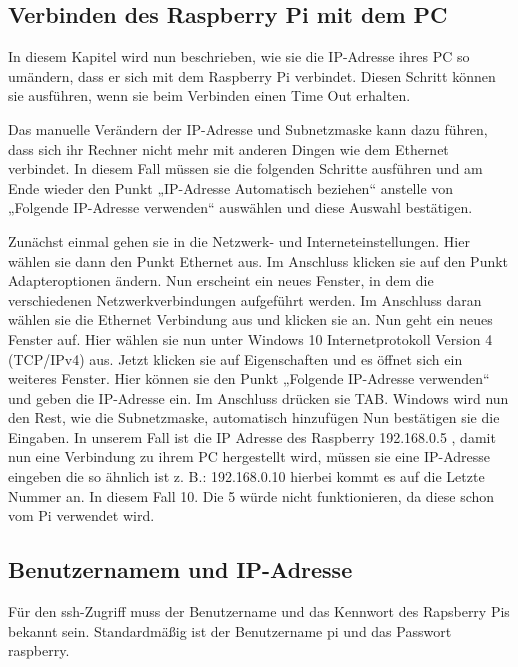 \subsection{Verbinden des Raspberry Pi mit dem PC}

In diesem Kapitel wird nun beschrieben, wie sie die IP-Adresse ihres PC so umändern, dass er sich mit dem Raspberry Pi verbindet. Diesen Schritt können sie ausführen, wenn sie beim Verbinden einen Time Out erhalten.

\begin{notes}
\item Das manuelle Verändern der IP-Adresse und Subnetzmaske kann dazu führen, dass sich ihr Rechner nicht mehr mit anderen Dingen wie dem Ethernet verbindet. In diesem Fall müssen sie die folgenden Schritte ausführen und am Ende wieder den Punkt „IP-Adresse Automatisch beziehen“ anstelle von „Folgende IP-Adresse verwenden“ auswählen und diese Auswahl bestätigen.
\end{notes}

Zunächst einmal gehen sie in die Netzwerk- und Interneteinstellungen. Hier wählen sie dann den Punkt Ethernet aus. Im Anschluss klicken sie auf den Punkt Adapteroptionen ändern. Nun erscheint ein neues Fenster, in dem die verschiedenen Netzwerkverbindungen aufgeführt werden. Im Anschluss daran wählen sie die Ethernet Verbindung aus und klicken sie an. Nun geht ein neues Fenster auf. Hier wählen sie nun unter Windows 10 Internetprotokoll Version 4 (TCP/IPv4) aus. Jetzt klicken sie auf Eigenschaften und es öffnet sich ein weiteres Fenster. Hier können sie den Punkt „Folgende IP-Adresse verwenden“ und geben die IP-Adresse ein. Im Anschluss drücken sie TAB. Windows wird nun den Rest, wie die Subnetzmaske, automatisch hinzufügen Nun bestätigen sie die Eingaben. In unserem Fall ist die IP Adresse des Raspberry 192.168.0.5   , damit nun eine Verbindung zu ihrem PC hergestellt wird, müssen sie eine IP-Adresse eingeben die so ähnlich ist z. B.: 192.168.0.10 hierbei kommt es auf die Letzte Nummer an. In diesem Fall 10. Die 5 würde nicht funktionieren, da diese schon vom Pi verwendet wird.


\subsection{Benutzernamem und IP-Adresse}

Für den ssh-Zugriff muss der Benutzername und das Kennwort 
des Rapsberry Pis bekannt sein. Standardmäßig ist der Benutzername \glqq pi\grqq{} und das Passwort
\glqq raspberry\grqq.



